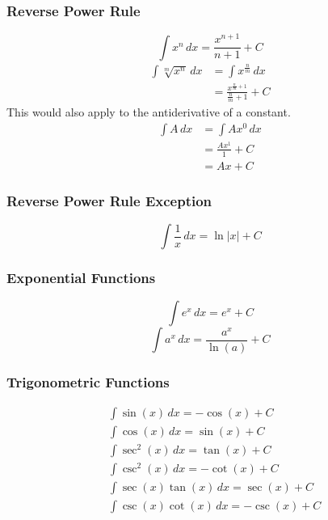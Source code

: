 \documentclass[12pt]{article}
\begin{document}
\subsubsection{Reverse Power Rule}
\[ \int x^n \, dx = \frac{x^{n+1}}{n+1} + C\]
\begin{align*}
    \int \sqrt[m]{x^n} \, dx & = \int x^{\frac{n}{m}} \, dx                      \\[6pt]
                             & = \frac{x^{\frac{n}{m} + 1}}{\frac{n}{m} + 1} + C
\end{align*}
\newline
This would also apply to the antiderivative of a constant.
\begin{align*}
    \int A \, dx & = \int Ax^0 \, dx    \\
                 & = \frac{Ax^1}{1} + C \\[6pt]
                 & = Ax + C
\end{align*}

\subsubsection{Reverse Power Rule Exception}
\[ \int \frac{1}{x} \, dx = \ln |x| + C\]

\subsubsection{Exponential Functions}
\[ \int e^x \, dx = e^x + C \]
\[ \int a^x \, dx = \frac{a^x}{\ln(a)} + C \]

\subsubsection{Trigonometric Functions}
\begin{align*}
     & \int \sin(x) \, dx = -\cos(x) + C        \\[6pt]
     & \int \cos(x) \, dx = \sin(x) + C         \\[6pt]
     & \int \sec^2(x) \, dx = \tan(x) + C       \\[6pt]
     & \int \csc^2(x) \, dx = -\cot(x) + C      \\[6pt]
     & \int \sec(x)\tan(x) \, dx = \sec(x) + C  \\[6pt]
     & \int \csc(x)\cot(x) \, dx = -\csc(x) + C
\end{align*}
\end{document}
